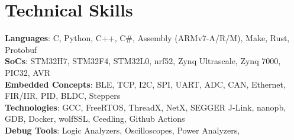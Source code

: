 \documentclass[letterpaper,10pt]{article}
\begin{document}
\section{Technical Skills}
 \begin{itemize}[leftmargin=0.15in, label={}]
    \small{\item{
     \textbf{Languages}{: C, Python, C++, C\#, Assembly (ARMv7-A/R/M), Make, Rust, Protobuf} \\
     \textbf{SoCs}{: STM32H7, STM32F4, STM32L0, nrf52, Zynq Ultrascale, Zynq 7000, PIC32, AVR} \\
     \textbf{Embedded Concepts}{: BLE, TCP, I2C, SPI, UART, ADC, CAN, Ethernet, FIR/IIR, PID, BLDC, Steppers } \\
     \textbf{Technologies}{: GCC, FreeRTOS, ThreadX, NetX, SEGGER J-Link, nanopb, GDB, Docker, wolfSSL, Ceedling, Github Actions} \\
     \textbf{Debug Tools}{: Logic Analyzers, Oscilloscopes, Power Analyzers, }
    }}
 \end{itemize}

\end{document}
